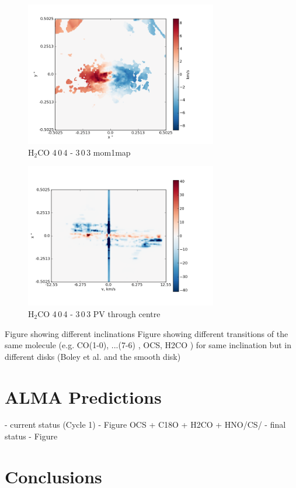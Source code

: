 \documentclass[useAMS,usenatbib]{mn2e}
\begin{document}
\begin{figure}
 \includegraphics[width=84mm]{Figures/sim/imageH2CO_4-0-4->3-0-3_30deg_mom1.png}

 \caption{H$_2$CO 4$\,$0$\,$4 - 3$\,$0$\,$3 mom1map}
\end{figure}

\begin{figure}
 \includegraphics[width=84mm]{Figures/sim/imageH2CO_4-0-4->3-0-3_30deg_PV_centre.png}

 \caption{H$_2$CO 4$\,$0$\,$4 - 3$\,$0$\,$3 PV through centre}
\end{figure}


Figure showing different inclinations  
Figure showing different transitions of the same molecule (e.g. CO(1-0), ...(7-6) , OCS,  H2CO ) for same inclination but in different disks (Boley et al. and the smooth disk)

\section{ALMA Predictions}

- current status (Cycle 1) - Figure
OCS + C18O + H2CO + HNO/CS/
- final status - Figure 


\section{Conclusions}
\end{document}
